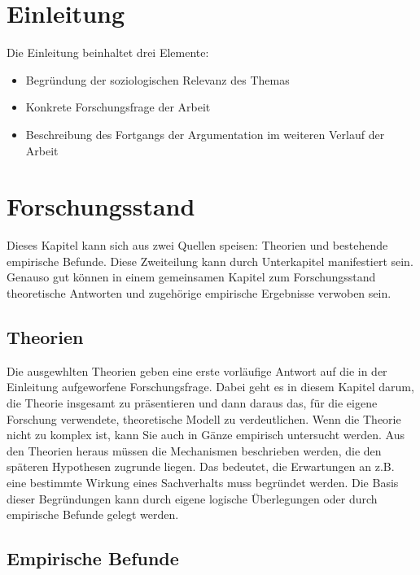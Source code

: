 \documentclass[
  12pt,
]{article}
\providecommand{\tightlist}{%
  \setlength{\itemsep}{0pt}\setlength{\parskip}{0pt}}
\begin{document}

\hypertarget{einleitung}{%
\section{Einleitung}\label{einleitung}}

Die Einleitung beinhaltet drei Elemente:

\begin{itemize}
\tightlist
\item
  Begründung der soziologischen Relevanz des Themas
\item
  Konkrete Forschungsfrage der Arbeit
\item
  Beschreibung des Fortgangs der Argumentation im weiteren Verlauf der
  Arbeit
\end{itemize}

\hypertarget{forschungsstand}{%
\section{Forschungsstand}\label{forschungsstand}}

Dieses Kapitel kann sich aus zwei Quellen speisen: Theorien und
bestehende empirische Befunde. Diese Zweiteilung kann durch Unterkapitel
manifestiert sein. Genauso gut können in einem gemeinsamen Kapitel zum
Forschungsstand theoretische Antworten und zugehörige empirische
Ergebnisse verwoben sein.

\hypertarget{theorien}{%
\subsection{Theorien}\label{theorien}}

Die ausgewhlten Theorien geben eine erste vorläufige Antwort auf die in
der Einleitung aufgeworfene Forschungsfrage. Dabei geht es in diesem
Kapitel darum, die Theorie insgesamt zu präsentieren und dann daraus
das, für die eigene Forschung verwendete, theoretische Modell zu
verdeutlichen. Wenn die Theorie nicht zu komplex ist, kann Sie auch in
Gänze empirisch untersucht werden. Aus den Theorien heraus müssen die
Mechanismen beschrieben werden, die den späteren Hypothesen zugrunde
liegen. Das bedeutet, die Erwartungen an z.B. eine bestimmte Wirkung
eines Sachverhalts muss begründet werden. Die Basis dieser Begründungen
kann durch eigene logische Überlegungen oder durch empirische Befunde
gelegt werden.

\hypertarget{empirische-befunde}{%
\subsection{Empirische Befunde}\label{empirische-befunde}}
\end{document}
